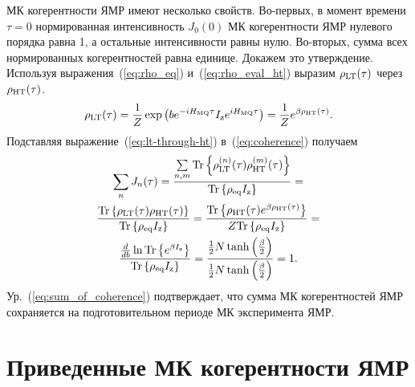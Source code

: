 МК когерентности ЯМР имеют несколько свойств.
Во-первых, в момент времени  $\tau=0$
нормированная интенсивность $J_0(0)$ МК когерентности ЯМР нулевого порядка равна 1,
а остальные интенсивности равны нулю.
Во-вторых, сумма всех нормированных когерентностей равна единице.
Докажем это утверждение.
Используя выражения~(\ref{eq:rho_eq}) и~(\ref{eq:rho_eval_ht})
выразим $\rho_\mathrm{LT}(\tau)$ через $\rho_\mathrm{HT}(\tau)$.
%
\begin{equation}\label{eq:lt-through-ht}
  \rho_\mathrm{LT}(\tau) = \dfrac 1 Z
  \exp\left(be^{-iH_\mathrm{MQ}\tau} I_\mathrm{z} e^{iH_\mathrm{MQ}\tau}\right) =
  \dfrac 1 Z e^{\beta\rho_\mathrm{HT}(\tau)}.
\end{equation}
%
Подставляя выражение~(\ref{eq:lt-through-ht}) в~(\ref{eq:coherence}) получаем
%
\begin{multline}\label{eq:sum_of_coherence}
  \sum\limits_n J_n(\tau) =
  \dfrac{\sum\limits_{n, m}\mathrm{Tr} \left\{ 
      \rho_\mathrm{LT}^{(n)}(\tau)\rho_\mathrm{HT}^{(m)}(\tau)
   \right\}}
  {\mathrm{Tr} \left\{ \rho_\mathrm{eq} I_\mathrm{z} \right\}} = \\
  \dfrac{\mathrm{Tr} \left\{ 
      \rho_\mathrm{LT}(\tau)\rho_\mathrm{HT}(\tau)
   \right\}}
  {\mathrm{Tr} \left\{ \rho_\mathrm{eq} I_\mathrm{z} \right\}} =
  \dfrac{\mathrm{Tr} \left\{ 
      \rho_\mathrm{HT}(\tau)e^{\beta\rho_\mathrm{HT}(\tau)}
   \right\}}
  {Z\mathrm{Tr} \left\{ \rho_\mathrm{eq} I_\mathrm{z} \right\}} = \\
  \dfrac{\frac{d}{db} \ln \mathrm{Tr} \left\{ 
      e^{\beta I_\mathrm{z}}
   \right\}}
  {\mathrm{Tr} \left\{ \rho_\mathrm{eq} I_\mathrm{z} \right\}} =
  \dfrac{\frac 1 2 N \tanh \left( \frac \beta 2 \right)}
  {\frac 1 2 N \tanh \left( \frac \beta 2 \right)} = 1.
\end{multline}
Ур.~(\ref{eq:sum_of_coherence}) подтверждает,
что сумма МК когерентностей ЯМР сохраняется на подготовительном периоде МК эксперимента ЯМР.


\section{Приведенные МК когерентности ЯМР}
\label{sec:reduced-mq-coherences}

